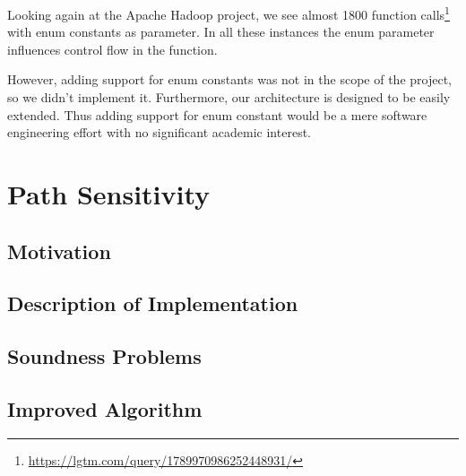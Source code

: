Looking again at the Apache Hadoop project, we see almost 1800
function calls\footnote{\url{https://lgtm.com/query/1789970986252448931/}} with enum constants as parameter.
In all these instances the enum parameter influences control flow in the function.

However, adding support for enum constants was not in the scope of the project, so we didn't implement it.
Furthermore, our architecture is designed to be easily extended.
Thus adding support for enum constant would be a mere software engineering effort
with no significant academic interest.


\newpage
\section{Path Sensitivity}
\subsection{Motivation}
\subsection{Description of Implementation}
\subsection{Soundness Problems}
\subsection{Improved Algorithm}




